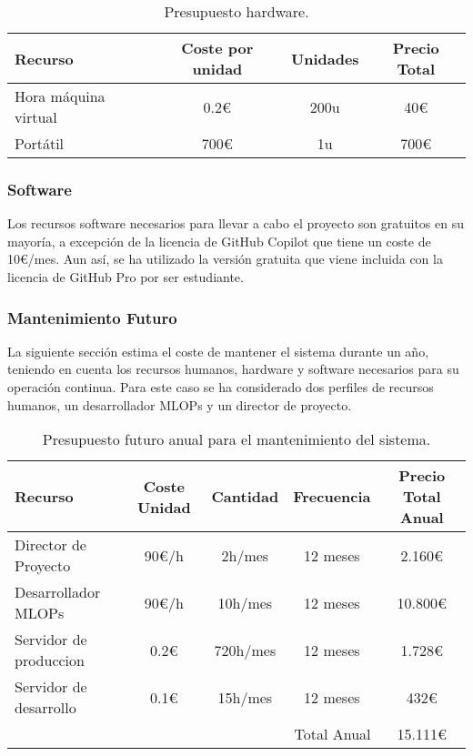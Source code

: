 \begin{table}[ht]
    \centering
    \begin{tabular}[ht]{l|c|c|c}
        \textbf{Recurso}     & \textbf{Coste por unidad} & \textbf{Unidades} & \textbf{Precio Total} \\
        \hline
        Hora máquina virtual & 0.2\euro                  & 200u              & 40\euro               \\
        Portátil             & 700\euro                  & 1u                & 700\euro              \\
    \end{tabular}
    \caption{Presupuesto hardware.}
    \label{tab:hardware-budget}
\end{table}

\subsubsection{Software}
Los recursos software necesarios para llevar a cabo el proyecto son gratuitos
en su mayoría, a excepción de la licencia de GitHub Copilot que tiene un coste
de 10\euro/mes. Aun así, se ha utilizado la versión gratuita que viene incluida
con la licencia de GitHub Pro por ser estudiante.

\subsubsection{Mantenimiento Futuro}
La siguiente sección estima el coste de mantener el sistema durante un año, teniendo 
en cuenta los recursos humanos, hardware y software necesarios para su operación continua.
Para este caso se ha considerado dos perfiles de recursos humanos, un desarrollador MLOPs
y un director de proyecto. 

\begin{table}[h]
    \centering
    \begin{tabular}[H]{l|c|c|c|c}
        \textbf{Recurso}           & \textbf{Coste Unidad} & \textbf{Cantidad} & \textbf{Frecuencia} & \textbf{Precio Total Anual} \\
        \hline
        Director de Proyecto        & 90\euro/h             & 2h/mes            & 12 meses           & 2.160\euro \\
        Desarrollador MLOPs         & 90\euro/h             & 10h/mes           & 12 meses           & 10.800\euro \\
        Servidor de produccion       & 0.2\euro              & 720h/mes         & 12 meses           & 1.728\euro   \\
        Servidor de desarrollo       & 0.1\euro              & 15h/mes          & 12 meses           & 432\euro   \\
        \hline
        \multicolumn{4}{r|}{Total Anual} & 15.111\euro \\
    \end{tabular}
    \caption{Presupuesto futuro anual para el mantenimiento del sistema.}
    \label{tab:future-budget}
\end{table}

